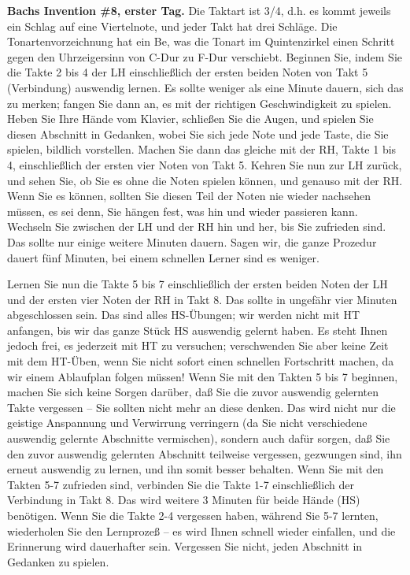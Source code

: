 
\label{c1iii6l2}

\textbf{Bachs Invention \#8, erster Tag.}
Die Taktart ist 3/4, d.h. es kommt jeweils ein Schlag auf eine Viertelnote, und jeder Takt hat drei Schläge.
Die Tonartenvorzeichnung hat ein Be, was die Tonart im Quintenzirkel einen Schritt gegen den Uhrzeigersinn von C-Dur zu F-Dur verschiebt.
Beginnen Sie, indem Sie die Takte 2 bis 4 der LH einschließlich der ersten beiden Noten von Takt 5 (Verbindung) auswendig lernen.
Es sollte weniger als eine Minute dauern, sich das zu merken; fangen Sie dann an, es mit der richtigen Geschwindigkeit zu spielen.
Heben Sie Ihre Hände vom Klavier, schließen Sie die Augen, und spielen Sie diesen Abschnitt in Gedanken, wobei Sie sich jede Note und jede Taste, die Sie spielen, bildlich vorstellen.
Machen Sie dann das gleiche mit der RH, Takte 1 bis 4, einschließlich der ersten vier Noten von Takt 5.
Kehren Sie nun zur LH zurück, und sehen Sie, ob Sie es ohne die Noten spielen können, und genauso mit der RH.
Wenn Sie es können, sollten Sie diesen Teil der Noten nie wieder nachsehen müssen, es sei denn, Sie hängen fest, was hin und wieder passieren kann.
Wechseln Sie zwischen der LH und der RH hin und her, bis Sie zufrieden sind.
Das sollte nur einige weitere Minuten dauern.
Sagen wir, die ganze Prozedur dauert fünf Minuten, bei einem schnellen Lerner sind es weniger.

Lernen Sie nun die Takte 5 bis 7 einschließlich der ersten beiden Noten der LH und der ersten vier Noten der RH in Takt 8.
Das sollte in ungefähr vier Minuten abgeschlossen sein.
Das sind alles HS-Übungen; wir werden nicht mit HT anfangen, bis wir das ganze Stück HS auswendig gelernt haben.
Es steht Ihnen jedoch frei, es jederzeit mit HT zu versuchen; verschwenden Sie aber keine Zeit mit dem HT-Üben, wenn Sie nicht sofort einen schnellen Fortschritt machen, da wir einem Ablaufplan folgen müssen!
Wenn Sie mit den Takten 5 bis 7 beginnen, machen Sie sich keine Sorgen darüber, daß Sie die zuvor auswendig gelernten Takte vergessen -- Sie sollten nicht mehr an diese denken.
Das wird nicht nur die geistige Anspannung und Verwirrung verringern (da Sie nicht verschiedene auswendig gelernte Abschnitte vermischen), sondern auch dafür sorgen, daß Sie den zuvor auswendig gelernten Abschnitt teilweise vergessen, gezwungen sind, ihn erneut auswendig zu lernen, und ihn somit besser behalten.
Wenn Sie mit den Takten 5-7 zufrieden sind, verbinden Sie die Takte 1-7 einschließlich der Verbindung in Takt 8.
Das wird weitere 3 Minuten für beide Hände (HS) benötigen.
Wenn Sie die Takte 2-4 vergessen haben, während Sie 5-7 lernten, wiederholen Sie den Lernprozeß -- es wird Ihnen schnell wieder einfallen, und die Erinnerung wird dauerhafter sein.
Vergessen Sie nicht, jeden Abschnitt in Gedanken zu spielen.

